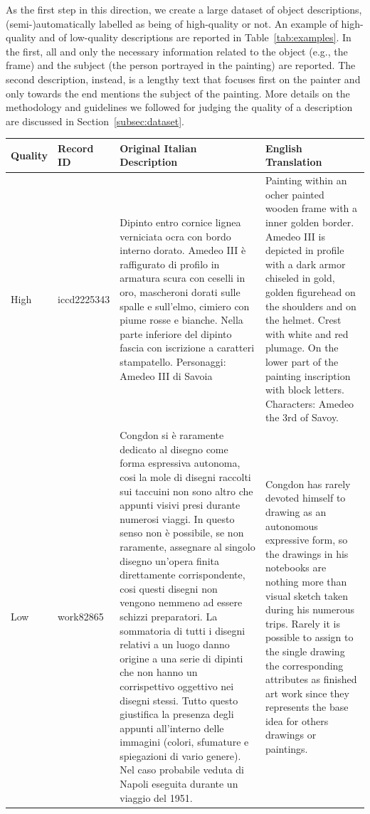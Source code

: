 \documentclass[epsfig,a4paper,12pt,titlepage]{book}
\begin{document}
As the first step in this direction, we create a large dataset of object descriptions, (semi-)automa\-tically labelled as being of high-quality or not. An example of high-quality and of low-quality descriptions are reported in Table~\ref{tab:examples}. In the first, all and only the necessary information related to the object (e.g., the frame) and the subject (the person portrayed in the painting) are reported. The second description, instead, is a lengthy text that focuses first on the painter and only towards the end mentions the subject of the painting. More details on the methodology and guidelines we followed for judging the quality of a description are discussed in Section~\ref{subsec:dataset}.

	\begin{table}[h!]
		\small
		\begin{tabular}{|p{1.3cm}|p{1.8cm}|p{5.8cm}|p{5.8cm}|}
			\hline
			Quality & Record ID & Original Italian Description & English Translation  \\
			\hline
			High &	iccd2225343 & Dipinto entro cornice lignea verniciata ocra con bordo interno dorato. Amedeo III \`e raffigurato di profilo in armatura scura con ceselli in oro, mascheroni dorati sulle spalle e sull'elmo, cimiero con piume rosse e bianche. Nella parte inferiore del dipinto fascia con iscrizione a caratteri stampatello. Personaggi: Amedeo III di Savoia   & Painting within an ocher painted wooden frame with a  inner golden border. Amedeo III is depicted in profile with a dark armor chiseled in gold, golden figurehead on the shoulders and on the helmet. Crest with white and red plumage. On the lower part of the painting inscription with block letters. Characters: Amedeo the 3rd of Savoy.\\\hline
			Low  &  work82865 & Congdon si \`e raramente dedicato al disegno come forma espressiva autonoma, cosi la mole di disegni raccolti sui taccuini non sono altro che appunti visivi presi durante numerosi viaggi. In questo senso non \`e possibile, se non raramente, assegnare al singolo disegno un'opera finita direttamente corrispondente, cosi questi disegni non vengono nemmeno ad essere schizzi preparatori. La sommatoria di tutti i disegni relativi a un luogo danno origine a una serie di dipinti che non hanno un corrispettivo oggettivo nei disegni stessi. Tutto questo giustifica la presenza degli appunti all'interno delle immagini (colori, sfumature e spiegazioni di vario genere). Nel caso probabile veduta di Napoli eseguita durante un viaggio del 1951.   & Congdon  has rarely devoted himself to drawing as an autonomous expressive form, so the drawings in his notebooks are nothing more than visual sketch taken during his numerous trips. Rarely it is possible to assign to the single drawing the corresponding attributes as finished art work since they represents the base idea for others drawings or paintings. 

\end{tabular}
\end{table}
\end{document}
